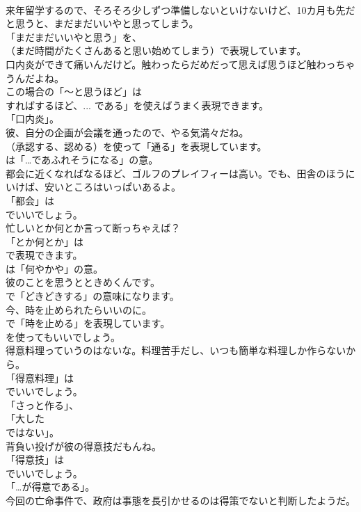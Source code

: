 \documentclass[8pt]{extreport}
\begin{document}
\begin{CJK}{UTF8}{min}
\\	来年留学するので、そろそろ少しずつ準備しないといけないけど、10カ月も先だと思うと、まだまだいいやと思ってしまう。 
\\	「まだまだいいやと思う」を、
\\	（まだ時間がたくさんあると思い始めてしまう）で表現しています。	
\\	口内炎ができて痛いんだけど。触わったらだめだって思えば思うほど触わっちゃうんだよね。 
\\	この場合の「～と思うほど」は
\\	すればするほど、... である」を使えばうまく表現できます。
\\	「口内炎」。	
\\	彼、自分の企画が会議を通ったので、やる気満々だね。 
\\	（承認する、認める）を使って「通る」を表現しています。
\\	は「…であふれそうになる」の意。	
\\	都会に近くなればなるほど、ゴルフのプレイフィーは高い。でも、田舎のほうにいけば、安いところはいっぱいあるよ。 
\\	「都会」は 
\\	でいいでしょう。	
\\	忙しいとか何とか言って断っちゃえば？ 
\\	「とか何とか」は 
\\	で表現できます。
\\	は「何やかや」の意。	
\\	彼のことを思うとときめくんです。 
\\	で「どきどきする」の意味になります。	
\\	今、時を止められたらいいのに。 
\\	で「時を止める」を表現しています。
\\	を使ってもいいでしょう。	
\\	得意料理っていうのはないな。料理苦手だし、いつも簡単な料理しか作らないから。 
\\	「得意料理」は
\\	でいいでしょう。
\\	「さっと作る」、
\\	「大した 
\\	ではない」。	
\\	背負い投げが彼の得意技だもんね。 
\\	「得意技」は
\\	でいいでしょう。
\\	「…が得意である」。	
\\	今回の亡命事件で、政府は事態を長引かせるのは得策でないと判断したようだ。 

\end{CJK}
\end{document}
